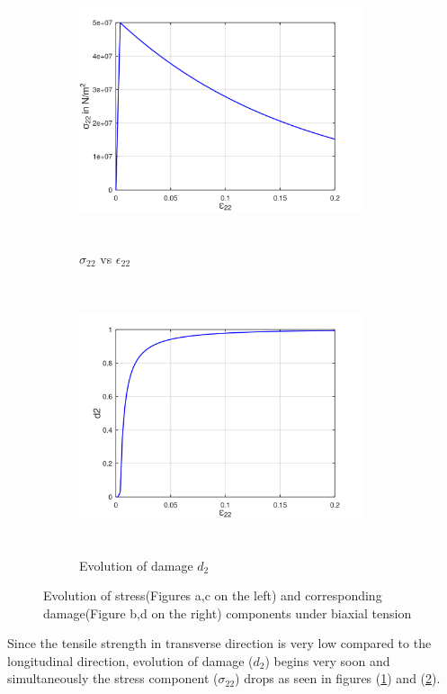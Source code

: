 \documentclass[a4paper,12pt,twoside]{report}
\begin{document}
\FloatBarrier
\begin{figure}[htbp!]\ContinuedFloat 
     \begin{subfigure}{0.4\textwidth}
         \includegraphics[width=8.3cm,height=8cm,keepaspectratio]{23.S22vsE22.png}
         \caption{$\sigma_{22}$ vs $\epsilon_{22}$}
         \label{fig:S22vsE22}
     \end{subfigure}
     \hspace{1.8cm}
     \begin{subfigure}{0.4\textwidth}
         \centering
         \includegraphics[width=8.3cm,height=8cm,keepaspectratio]{23.d2.png}
         \caption{Evolution of damage $d_{2}$}
         \label{fig:Evolution of damage d2}
     \end{subfigure}
    
        \caption{Evolution of stress(Figures a,c on the left) and corresponding damage(Figure b,d on the right) components under biaxial tension}
        \label{fig:Evolution of damage under biaxial tension}     
\end{figure} 
\FloatBarrier
Since the tensile strength in transverse direction is very low compared to the longitudinal direction, evolution of damage ($d_{2}$) begins very soon and simultaneously the stress component ($\sigma_{22}$) drops as seen in figures (\ref{fig:S22vsE22}) and (\ref{fig:Evolution of damage d2}).
\end{document}
